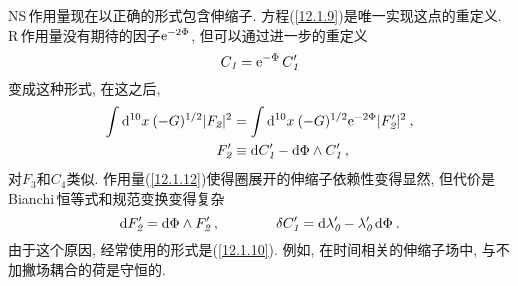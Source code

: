 NS\,作用量现在以正确的形式包含伸缩子. 方程(\ref{12.1.9})是唯一实现这点的重定义. R\,作用量没有期待的因子$ \mathrm{e}^{-2\Phi}$, 但可以通过进一步的重定义
\begin{equation}
    C_{\textit{1}} =\mathrm{e}^{-\Phi}\,C_{\textit{1}}^{\prime} \label{12.1.11}
\end{equation}
变成这种形式, 在这之后,
\begin{subequations}
    \begin{align}
        \int \mathrm{d}^{10}x\:(-G)^{1/2}\lvert F_{\textit{2}}\rvert^{2} &= \int \mathrm{d}^{10}x\: (-G)^{1/2}\mathrm{e}^{-2\Phi}\lvert F_{\textit{2}}^{\prime}\rvert^{2} \:, \label{12.1.12a} \\
        F_{\textit{2}}^{\prime} &\equiv \mathrm{d} C_{\textit{1}}^{\prime}-\mathrm{d}\Phi\wedge C_{\textit{1}}^{\prime} \:, \label{12.1.12b}
    \end{align} \label{12.1.12}
\end{subequations}
对$ F_{\textit{3}} $和$ C_{\textit{4}} $类似. 作用量(\ref{12.1.12})使得圈展开的伸缩子依赖性变得显然, 但代价是\,Bianchi\,恒等式和规范变换变得复杂
\begin{equation}    
    \mathrm{d} F_{\textit{2}}^{\prime} = \mathrm{d} \Phi\wedge F_{\textit{2}}^{\prime}\:,\qquad\qquad 
    \delta C_{\textit{1}}^{\prime} =\mathrm{d} \lambda_{\textit{0}}^{\prime}- \lambda_{\textit{0}}^{\prime}\,\mathrm{d}\Phi \:. \label{12.1.13}
\end{equation}  
由于这个原因, 经常使用的形式是(\ref{12.1.10}). 例如, 在时间相关的伸缩子场中, 与不加撇场耦合的荷是守恒的.

